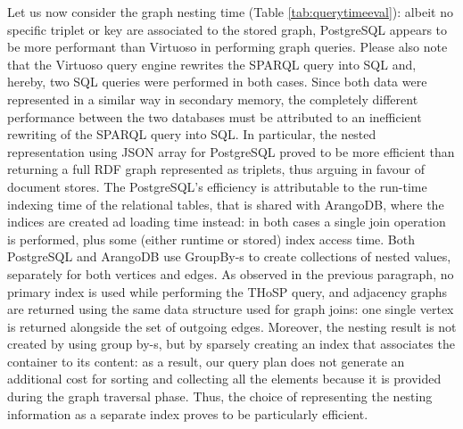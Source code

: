 Let us now consider the graph nesting time (Table \ref{tab:querytimeeval}): albeit no specific triplet or key are associated to the stored graph, PostgreSQL appears to be more performant than Virtuoso in performing graph queries. Please also note that the Virtuoso query engine rewrites the SPARQL query into SQL and, hereby, two SQL queries were performed in both cases. Since both data were represented in a similar way in secondary memory, the completely different performance between the two databases must be attributed  to an inefficient rewriting of the SPARQL query into SQL. In particular, the nested representation using JSON array for PostgreSQL proved to be more efficient than returning a full RDF graph represented as triplets, thus arguing in favour of document stores. The PostgreSQL's efficiency is attributable to the run-time indexing time of the relational tables, that is shared with ArangoDB, where the indices are created ad loading time instead: in both cases a single join operation is performed, plus some (either runtime or stored) index access time. Both PostgreSQL and ArangoDB use GroupBy-s to create collections of nested values, separately for both vertices and edges. As observed in the previous paragraph, no primary index is used while performing the THoSP query, and adjacency graphs are returned using the same data structure used for graph joins: one single vertex is returned alongside the set of outgoing edges. Moreover, the nesting result is not created by using group by-s, but by sparsely creating an index that associates the container to its content: as a result, our query plan does not generate an additional cost for sorting and collecting all the elements because it is provided during the graph traversal phase. Thus, the choice of representing the nesting information as a separate index proves to be particularly efficient.


